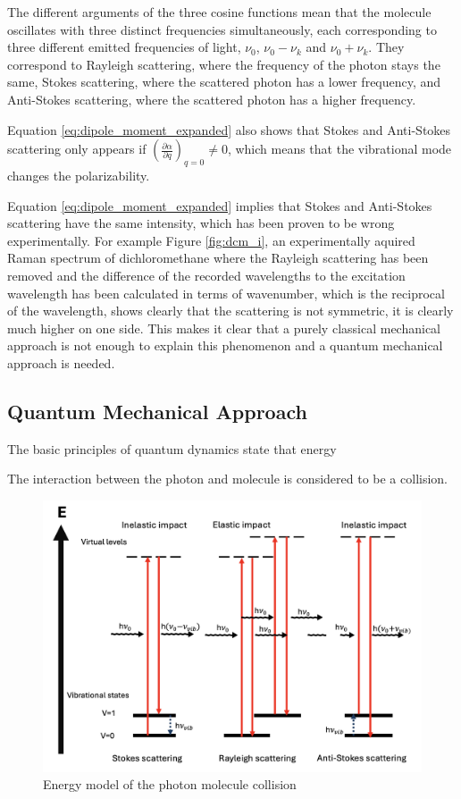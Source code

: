 The different arguments of the three cosine functions mean that the molecule oscillates with three distinct frequencies simultaneously, each corresponding to three different emitted frequencies of light, \(\nu_0\), \(\nu_0-\nu_k\) and \(\nu_0+\nu_k\). They correspond to Rayleigh scattering, where the frequency of the photon stays the same, Stokes scattering, where the scattered photon has a lower frequency, and Anti-Stokes scattering, where the scattered photon has a higher frequency.

\bigskip

Equation \ref{eq:dipole_moment_expanded} also shows that Stokes and Anti-Stokes scattering only appears if \((\frac{\partial\alpha}{\partial q})_{q=0}\neq 0\), which means that the vibrational mode changes the polarizability.

\bigskip

Equation \ref{eq:dipole_moment_expanded} implies that Stokes and Anti-Stokes scattering have the same intensity, which has been proven to be wrong experimentally. For example Figure \ref{fig:dcm_i}, an experimentally aquired Raman spectrum of dichloromethane where the Rayleigh scattering has been removed and the difference of the recorded wavelengths to the excitation wavelength has been calculated in terms of wavenumber, which is the reciprocal of the wavelength, shows clearly that the scattering is not symmetric, it is clearly much higher on one side. This makes it clear that a purely classical mechanical approach is not enough to explain this phenomenon and a quantum mechanical approach is needed.

\newpage

\subsection{Quantum Mechanical Approach}

The basic principles of quantum dynamics state that energy 

The interaction between the photon and molecule is considered to be a collision.

\begin{figure}[h]
    \includegraphics[width=\textwidth]{images/theory/qm_scattering.png}
    \caption{Energy model of the photon molecule collision}
\end{figure}


